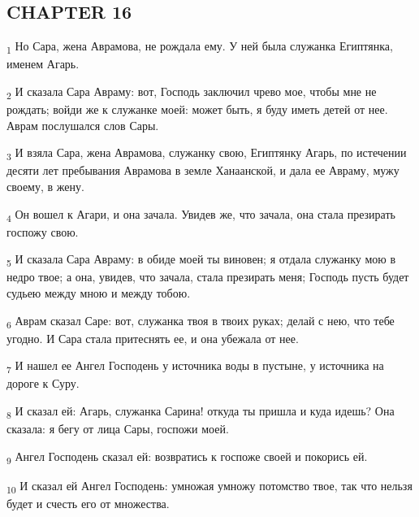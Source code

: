 \subsection{CHAPTER 16}
\begin{tcolorbox}
\textsubscript{1} Но Сара, жена Аврамова, не рождала ему. У ней была служанка Египтянка, именем Агарь.
\end{tcolorbox}
\begin{tcolorbox}
\textsubscript{2} И сказала Сара Авраму: вот, Господь заключил чрево мое, чтобы мне не рождать; войди же к служанке моей: может быть, я буду иметь детей от нее. Аврам послушался слов Сары.
\end{tcolorbox}
\begin{tcolorbox}
\textsubscript{3} И взяла Сара, жена Аврамова, служанку свою, Египтянку Агарь, по истечении десяти лет пребывания Аврамова в земле Ханаанской, и дала ее Авраму, мужу своему, в жену.
\end{tcolorbox}
\begin{tcolorbox}
\textsubscript{4} Он вошел к Агари, и она зачала. Увидев же, что зачала, она стала презирать госпожу свою.
\end{tcolorbox}
\begin{tcolorbox}
\textsubscript{5} И сказала Сара Авраму: в обиде моей ты виновен; я отдала служанку мою в недро твое; а она, увидев, что зачала, стала презирать меня; Господь пусть будет судьею между мною и между тобою.
\end{tcolorbox}
\begin{tcolorbox}
\textsubscript{6} Аврам сказал Саре: вот, служанка твоя в твоих руках; делай с нею, что тебе угодно. И Сара стала притеснять ее, и она убежала от нее.
\end{tcolorbox}
\begin{tcolorbox}
\textsubscript{7} И нашел ее Ангел Господень у источника воды в пустыне, у источника на дороге к Суру.
\end{tcolorbox}
\begin{tcolorbox}
\textsubscript{8} И сказал ей: Агарь, служанка Сарина! откуда ты пришла и куда идешь? Она сказала: я бегу от лица Сары, госпожи моей.
\end{tcolorbox}
\begin{tcolorbox}
\textsubscript{9} Ангел Господень сказал ей: возвратись к госпоже своей и покорись ей.
\end{tcolorbox}
\begin{tcolorbox}
\textsubscript{10} И сказал ей Ангел Господень: умножая умножу потомство твое, так что нельзя будет и счесть его от множества.
\end{tcolorbox}

